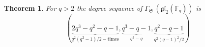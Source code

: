 \documentclass[11pt]{amsart}
\theoremstyle{plain}
\newtheorem{theorem}{Theorem}[section]
\def\F{\mathbb{F}}
\begin{document}




\begin{theorem}\label{Th4.4}
For $q>2$ the degree sequence of $\Gamma_{\mathfrak S}\,(\mathfrak{gl}_2 (\F_q))$ is 
\begin{equation*}
(\underbrace{2q^3-q^2-q-1}_{q^2(q^2-1)/2-\text{times}}, \underbrace{q^3-q-1}_{q^3-q}, \underbrace{q^2-q-1}_{q^2(q-1)^2/2})
\end{equation*}
\end{theorem} 


\quad
\end{document}
